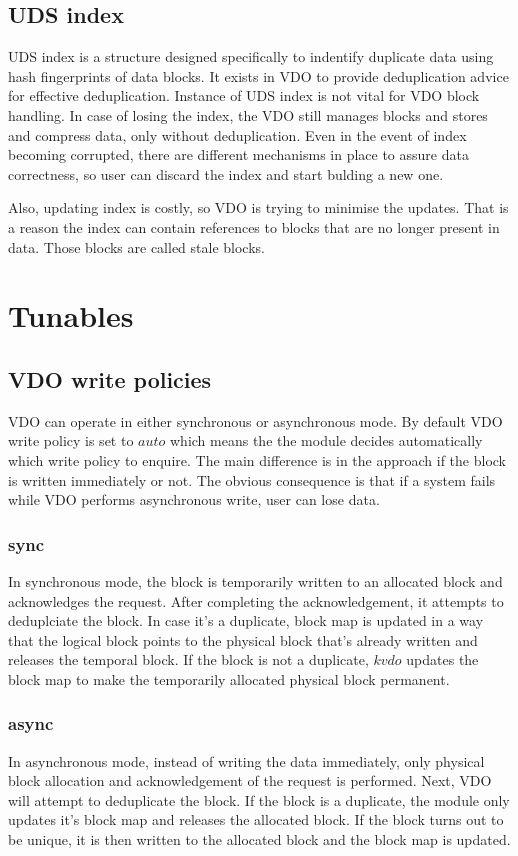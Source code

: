 \documentclass[
  color, %
  table, %
  lof,   %
  lot,   %
]{fithesis3}
\begin{document}
\subsection{UDS index}
UDS index is a structure designed specifically to indentify duplicate data using hash fingerprints of data blocks. It exists in VDO to provide deduplication advice for effective deduplication. Instance of UDS index is not vital for VDO block handling. In case of losing the index, the VDO still manages blocks and stores and compress data, only without deduplication. Even in the event of index becoming corrupted, there are different mechanisms in place to assure data correctness, so user can discard the index and start bulding a new one.

Also, updating index is costly, so VDO is trying to minimise the updates. That is a reason the index can contain references to blocks that are no longer present in data. Those blocks are called stale blocks.

\section{Tunables}

\subsection{VDO write policies}
VDO can operate in either synchronous or asynchronous mode. By default VDO write policy is set to $auto$ which means the the module decides automatically which write policy to enquire. The main difference is in the approach if the block is written immediately or not. The obvious consequence is that if a system fails while VDO performs asynchronous write, user can lose data.

\subsubsection{sync}
In synchronous mode, the block is temporarily written to an allocated block and acknowledges the request. After completing the acknowledgement, it attempts to deduplciate the block. In case it's a duplicate, block map is updated in a way that the logical block points to the physical block that's already written and releases the temporal block. If the block is not a duplicate, $kvdo$ updates the block map to make the temporarily allocated physical block permanent.

\subsubsection{async}
In asynchronous mode, instead of writing the data immediately, only physical block allocation and acknowledgement of the request is performed. Next, VDO will attempt to deduplicate the block. If the block is a duplicate, the module only updates it's block map and releases the allocated block. If the block turns out to be unique, it is then written to the allocated block and the block map is updated.
\end{document}
